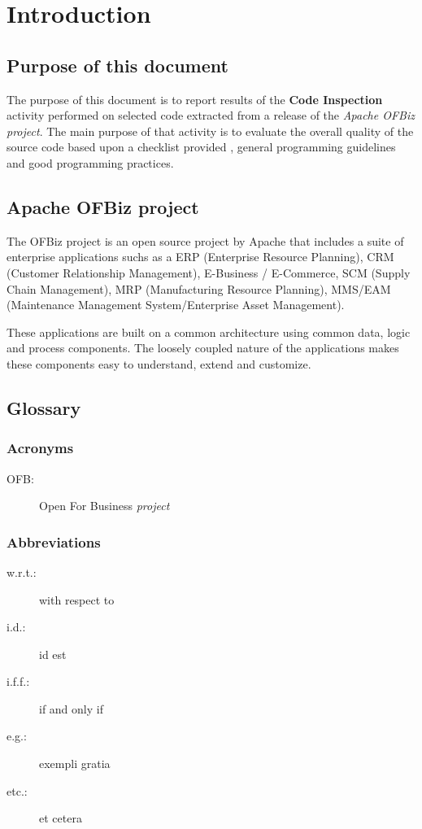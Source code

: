 \section{Introduction}

\subsection{Purpose of this document}
The purpose of this document is to report results of the \textbf{Code Inspection} activity performed on selected code extracted from a release of the \textit{Apache OFBiz project}. The main purpose of that activity is to evaluate the overall quality of the source code based upon a checklist provided \cite{Assignment}, general programming guidelines and good programming practices.

\subsection{Apache OFBiz project}
The OFBiz project is an open source project by Apache that  includes a suite of enterprise applications suchs as a ERP (Enterprise Resource Planning), CRM (Customer Relationship Management), E-Business / E-Commerce, SCM (Supply Chain Management), MRP (Manufacturing Resource Planning), MMS/EAM (Maintenance Management System/Enterprise Asset Management).

These applications are built on a common architecture using common data, logic and process components. The loosely coupled nature of the applications makes these components easy to understand, extend and customize\cite{OFBiz}.

\subsection{Glossary}
\subsubsection{Acronyms}
\begin{description}
		\item [OFB:] Open For Business \emph{project}
	\end{description}
\subsubsection{Abbreviations}
	\begin{description}
		\item [w.r.t.:] with respect to
		\item [i.d.:] id est
		\item [i.f.f.:] if and only if
		\item [e.g.:] exempli gratia
		\item [etc.:] et cetera
	\end{description}

